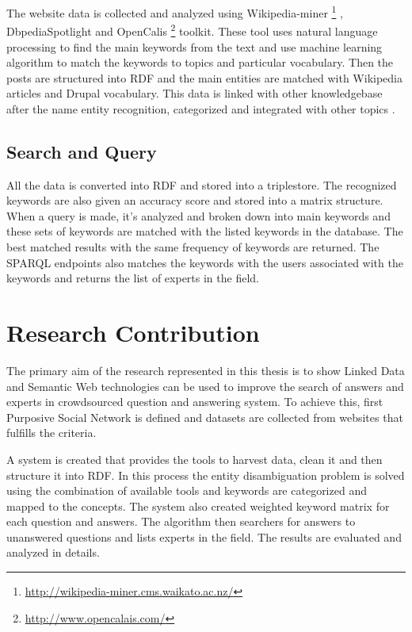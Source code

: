 The website data is collected and analyzed using Wikipedia-miner \footnote{\url{http://wikipedia-miner.cms.waikato.ac.nz/}} \cite{milne2012open}, DbpediaSpotlight and OpenCalis \footnote{\url{http://www.opencalais.com/}} toolkit. These tool uses natural language processing to find the main keywords from the text and use machine learning algorithm to match the keywords to topics and particular vocabulary.  Then the posts are structured into RDF and the main entities are matched with Wikipedia articles and Drupal vocabulary. This data is linked with other knowledgebase after the name entity recognition, categorized and integrated with other topics \cite{Glaser2009}.

\subsection{Search and Query}

All the data is converted into RDF and stored into a triplestore. The recognized keywords are also given an accuracy score and stored into a matrix structure. When a query is made, it's analyzed and broken down into main keywords and these sets of keywords are matched with the listed keywords in the database. The best matched results with the same frequency of keywords are returned. The SPARQL endpoints also matches the keywords with the users associated with the keywords and returns the list of experts in the field.


\section{Research Contribution}

The primary aim of the research represented in this thesis is to show Linked Data and Semantic Web technologies can be used to improve the search of answers and experts in crowdsourced question and answering system. To achieve this, first Purposive Social Network is defined and datasets are collected from websites that fulfills the criteria.

A system is created that provides the tools to harvest data, clean it and then structure it into RDF. In this process the entity disambiguation problem is solved using the combination of available tools and keywords are categorized and mapped to the concepts. The system also created weighted keyword matrix for each question and answers. The algorithm then searchers for answers to unanswered questions and lists experts in the field. The results are evaluated and analyzed in details.


